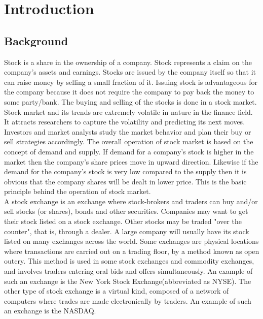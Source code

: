 \newpage
\section{Introduction}

\subsection{Background}
Stock is a share in the ownership of a company. Stock represents a claim on the company's assets and earnings. Stocks are issued by the company itself so that it can raise money by selling a small fraction of it. Issuing stock is advantageous for the company because it does not require the company to pay back the money to some party/bank. The buying and selling of the stocks is done in a stock market.\\

Stock market and its trends are extremely volatile in nature in the finance field. It attracts researchers to capture the volatility and predicting its next moves. Investors and market analysts study the market behavior and plan their buy or sell strategies accordingly. The overall operation of stock market is based on the concept of demand and supply. If demand for a company's stock is higher in the market then the company's share prices move in upward direction. Likewise if the demand for the company's stock is very low compared to the supply then it is obvious that the company shares will be dealt in lower price. This is the basic principle behind the operation of stock market.\\

A stock exchange is an exchange where stock-brokers and traders can buy and/or sell stocks (or shares), bonds and other securities. Companies may want to get their stock listed on a stock exchange. Other stocks may be traded "over the counter", that is, through a dealer. A large company will usually have its stock listed on many exchanges across the world. Some exchanges are physical locations where transactions are carried out on a trading floor, by a method known as open outcry. This method is used in some stock exchanges and commodity exchanges, and involves traders entering oral bids and offers simultaneously. An example of such an exchange is the New York Stock Exchange(abbreviated as NYSE). The other type of stock exchange is a virtual kind, composed of a network of computers where trades are made electronically by traders. An example of such an exchange is the NASDAQ.\\

